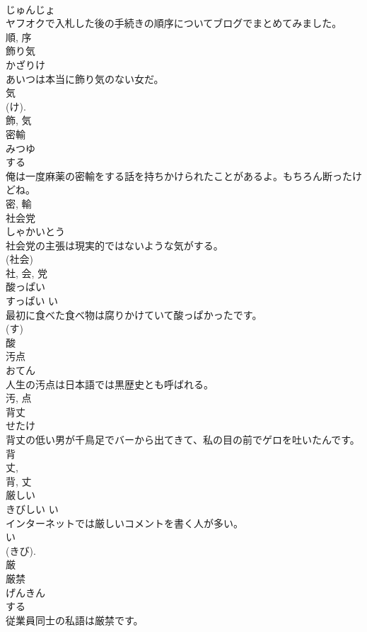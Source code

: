 \documentclass[8pt]{extreport}
\begin{document}
\begin{CJK}{UTF8}{min}
\\	じゅんじょ	
\\	ヤフオクで入札した後の手続きの順序についてブログでまとめてみました。	
\\	順, 序	
\\	飾り気	
\\	かざりけ	
\\	あいつは本当に飾り気のない女だ。	
\\	気 
\\	(け). 
\\	飾, 気	
\\	密輸	
\\	みつゆ	
\\	する 
\\	俺は一度麻薬の密輸をする話を持ちかけられたことがあるよ。もちろん断ったけどね。	
\\	密, 輸	
\\	社会党	
\\	しゃかいとう	
\\	社会党の主張は現実的ではないような気がする。	
\\	(社会) 
\\	社, 会, 党	
\\	酸っぱい	
\\	すっぱい	い 
\\	最初に食べた食べ物は腐りかけていて酸っぱかったです。	
\\	(す) 
\\	酸	
\\	汚点	
\\	おてん	
\\	人生の汚点は日本語では黒歴史とも呼ばれる。	
\\	汚, 点	
\\	背丈	
\\	せたけ	
\\	背丈の低い男が千鳥足でバーから出てきて、私の目の前でゲロを吐いたんです。	
\\	背 
\\	丈, 
\\	背, 丈	
\\	厳しい	
\\	きびしい	い 
\\	インターネットでは厳しいコメントを書く人が多い。	
\\	い 
\\	(きび). 
\\	厳	
\\	厳禁	
\\	げんきん	
\\	する 
\\	従業員同士の私語は厳禁です。	

\end{CJK}
\end{document}
